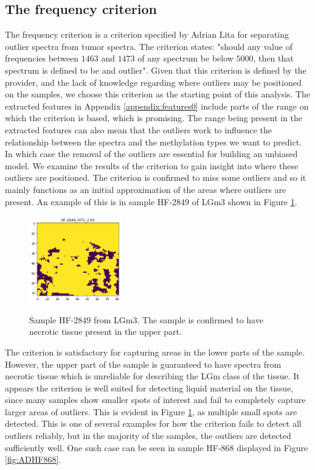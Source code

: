 \subsection{The frequency criterion}

The frequency criterion is a criterion specified by Adrian Lita for separating outlier spectra from tumor spectra. The criterion states: "should any value of frequencies between $1463$ and $1473$ of any spectrum be below $5000$, then that spectrum is defined to be and outlier". Given that this criterion is defined by the provider, and the lack of knowledge regarding where outliers may be positioned on the samples, we choose this criterion as the starting point of this analysis. The extracted features in Appendix \ref{appendix:features0} include parts of the range on which the criterion is based, which is promising. The range being present in the extracted features can also mean that the outliers work to influence the relationship between the spectra and the methylation types we want to predict. In which case the removal of the outliers are essential for building an unbiased model. We examine the results of the criterion to gain insight into where these outliers are positioned. The criterion is confirmed to miss some outliers and so it mainly functions as an initial approximation of the areas where outliers are present. An example of this is in sample HF-2849 of LGm3 shown in Figure \ref{fig:HF2849_1}.

\begin{figure}[H]

    \centering
{\includegraphics[width=4cm]{images/AdriansCriterion/LGm-3/HF-2849_VIT2_2.h5_5.png} }
\caption{Sample HF-2849 from LGm3. The sample is confirmed to have necrotic tissue present in the upper part.\label{fig:HF2849_1}}%

\end{figure}

The criterion is satisfactory for capturing areas in the lower parts of the sample. However, the upper part of the sample is guaranteed to have spectra from necrotic tissue which is unreliable for describing the LGm class of the tissue. It appears the criterion is well suited for detecting liquid material on the tissue, since many samples show smaller spots of interest and fail to completely capture larger areas of outliers. This is evident in Figure \ref{fig:HF2849_1}, as multiple small spots are detected. This is one of several examples for how the criterion fails to detect all outliers reliably, but in the majority of the samples, the outliers are detected sufficiently well. One such case can be seen in sample HF-868 displayed in Figure \ref{fig:ADHF868}.

